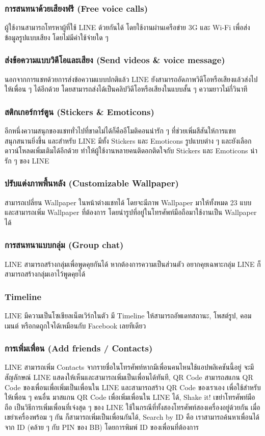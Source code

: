 \subsubsection{การสนทนาด้วยเสียงฟรี (Free voice calls)} 
\quad ผู้ใช้งานสามารถโทรหาผู้ที่ใช้ LINE ด้วยกันได้ โดยใช้งานผ่านเครือข่าย 3G และ Wi-Fi เพื่อส่งข้อมูลรูปแบบเสียง โดยไม่มีค่าใช้จ่ายใด ๆ  
\subsubsection{ส่งข้อความแบบวิดีโอและเสียง (Send videos \& voice message)} 
\quad นอกจากการแชทด้วยการส่งข้อความแบบปกติแล้ว LINE ยังสามารถอัดภาพวิดีโอหรือเสียงแล้วส่งไปให้เพื่อน ๆ ได้อีกด้วย โดยสามารถส่งได้เป็นคลิปวิดีโอหรือเสียงในแบบสั้น ๆ ความยาวไม่กี่วินาที   
\subsubsection{สติกเกอร์การ์ตูน (Stickers \& Emoticons)}
\quad อีกหนึ่งความสนุกของแชททั่วไปที่ขาดไม่ได้ก็คืออีโมติคอนน่ารัก ๆ ที่ช่วยเพิ่มสีสันให้การแชทสนุกสนานยิ่งขึ้น และสำหรับ LINE มีทั้ง Stickers และ Emoticons รูปแบบต่าง ๆ และยังเลือกดาวน์โหลดเพิ่มเติมได้อีกด้วย ทำให้ผู้ใช้งานหลายคนติดอกติดใจกับ Stickers และ Emoticons น่ารัก ๆ ของ LINE  
\subsubsection{ปรับแต่งภาพพื้นหลัง (Customizable Wallpaper)}
\quad สามารถเปลี่ยน Wallpaper ในหน้าต่างแชทได้ โดยจะมีภาพ Wallpaper มาให้ทั้งหมด 23 แบบ และสามารถเพิ่ม Wallpaper ที่ต้องการ โดยนำรูปที่อยู่ในโทรศัพท์มือถือมาใช้งานเป็น Wallpaper ได้  
\subsubsection{การสนทนาแบบกลุ่ม (Group chat)} 
\quad LINE สามารถสร้างกลุ่มเพื่อพูดคุยกันได้ หากต้องการความเป็นส่วนตัว อยากคุยเฉพาะกลุ่ม LINE ก็สามารถสร้างกลุ่มเอาไว้พูดคุยได้ 
\subsubsection{Timeline} 
\quad LINE มีความเป็นโซเชียลเน็ตเวิร์กในตัว มี Timeline ให้สามารถอัพเดทสถานะ, โพสต์รูป, คอมเมนต์ หรือกดถูกใจได้เหมือนกับ Facebook เลยทีเดียว 
\subsubsection{การเพิ่มเพื่อน (Add friends / Contacts)}
\quad LINE สามารถเพิ่ม Contacts จากรายชื่อในโทรศัพท์หากมีเพื่อนคนไหนใช้แอปพลิเคชันนี้อยู่ จะมีสัญลักษณ์ LINE แสดงให้เห็นและสามารถเพิ่มเป็นเพื่อนได้ทันที, QR Code สามารถสแกน QR Code ของเพื่อนเพื่อเพิ่มเป็นเพื่อนใน LINE และสามารถสร้าง QR Code ของเราเอง เพื่อใช้สำหรับให้เพื่อน ๆ คนอื่น มาสแกน QR Code เพื่อเพิ่มเพื่อนใน LINE ได้, Shake it! เขย่าโทรศัพท์มือถือ เป็นวิธีการเพิ่มเพื่อนที่เจ๋งสุด ๆ ของ LINE ใช้ในกรณีที่ทั้งสองโทรศัพท์สองเครื่องอยู่ด้วยกัน เมื่อเขย่าเครื่องพร้อม ๆ กัน ก็สามารถเพิ่มเป็นเพื่อนกันได้, Search by ID คือ เราสามารถค้นหาเพื่อนได้จาก ID (คล้าย ๆ กับ PIN ของ BB) โดยการพิมพ์ ID ของเพื่อนที่ต้องการ 

